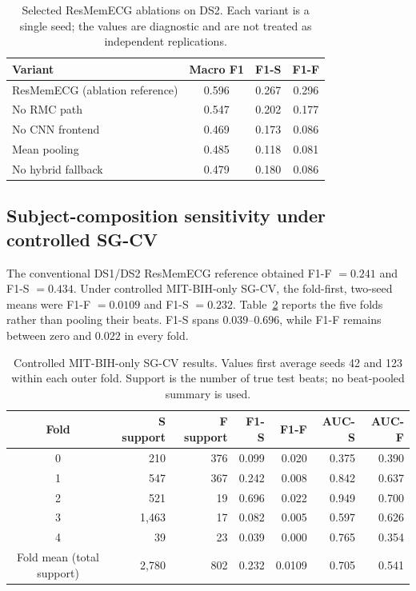 \documentclass[pdflatex,sn-mathphys-num]{sn-jnl}
\begin{document}
\begin{table}[htbp]
\caption{Selected ResMemECG ablations on DS2. Each variant is a single seed;
the values are diagnostic and are not treated as independent replications.}
\label{tab:resmemecg-ablation}
\centering
\begin{tabular}{@{}lccc@{}}
\toprule
Variant & Macro F1 & F1-S & F1-F \\
\midrule
ResMemECG (ablation reference) & 0.596 & 0.267 & 0.296 \\
No RMC path & 0.547 & 0.202 & 0.177 \\
No CNN frontend & 0.469 & 0.173 & 0.086 \\
Mean pooling & 0.485 & 0.118 & 0.081 \\
No hybrid fallback & 0.479 & 0.180 & 0.086 \\
\bottomrule
\end{tabular}
\end{table}

\subsection{Subject-composition sensitivity under controlled SG-CV}
The conventional DS1/DS2 ResMemECG reference obtained F1-F $=0.241$ and F1-S
$=0.434$. Under controlled MIT-BIH-only SG-CV, the fold-first, two-seed means
were F1-F $=0.0109$ and F1-S $=0.232$. Table~\ref{tab:sgcv-folds} reports the
five folds rather than pooling their beats. F1-S spans $0.039$--$0.696$, while
F1-F remains between zero and $0.022$ in every fold.

\begin{table}[htbp]
\caption{Controlled MIT-BIH-only SG-CV results. Values first average seeds 42
and 123 within each outer fold. Support is the number of true test beats; no
beat-pooled summary is used.}
\label{tab:sgcv-folds}
\centering
\begin{tabular}{@{}crrrrrr@{}}
\toprule
Fold & S support & F support & F1-S & F1-F & AUC-S & AUC-F \\
\midrule
0 & 210   & 376 & 0.099 & 0.020 & 0.375 & 0.390 \\
1 & 547   & 367 & 0.242 & 0.008 & 0.842 & 0.637 \\
2 & 521   & 19  & 0.696 & 0.022 & 0.949 & 0.700 \\
3 & 1,463 & 17  & 0.082 & 0.005 & 0.597 & 0.626 \\
4 & 39    & 23  & 0.039 & 0.000 & 0.765 & 0.354 \\
\midrule
Fold mean (total support) & 2{,}780 & 802 & 0.232 & 0.0109 & 0.705 & 0.541 \\
\bottomrule
\end{tabular}
\end{table}
\end{document}
